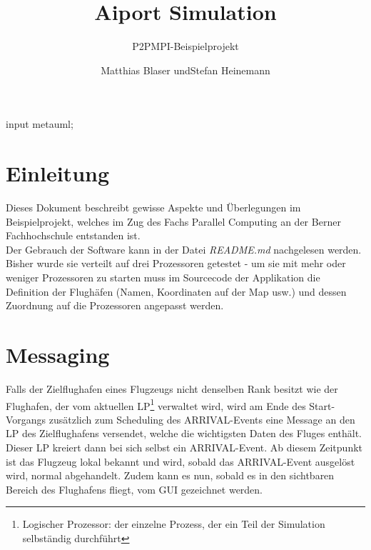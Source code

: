 \documentclass[oneside,DIV12,BCOR0.5cm,bibliography=totoc]{template}
\begin{document}
\begin{empfile}
\begin{empcmds}
input metauml;
\end{empcmds}


\title{Aiport Simulation}
\subtitle{P2PMPI-Beispielprojekt}

\author{Matthias Blaser undStefan Heinemann }

\maketitle


\section{Einleitung}

Dieses Dokument beschreibt gewisse Aspekte und Überlegungen im Beispielprojekt, 
welches im Zug des Fachs Parallel Computing an der Berner Fachhochschule 
entstanden ist.\\

Der Gebrauch der Software kann in der Datei \emph{README.md} nachgelesen
werden. Bisher wurde sie verteilt auf drei Prozessoren getestet - um
sie mit mehr oder weniger Prozessoren zu starten muss im Sourcecode der
Applikation die Definition der Flughäfen (Namen, Koordinaten auf der
Map usw.) und dessen Zuordnung auf die Prozessoren angepasst werden.


\section{Messaging}

Falls der Zielflughafen eines Flugzeugs nicht denselben Rank besitzt
wie der Flughafen, der vom aktuellen LP\footnote{Logischer Prozessor:
der einzelne Prozess, der ein Teil der Simulation selbständig
durchführt} verwaltet wird, wird am Ende des Start-Vorgangs zusätzlich
zum Scheduling des ARRIVAL-Events eine Message an den LP des
Zielflughafens versendet, welche die wichtigsten Daten des Fluges
enthält. Dieser LP kreiert dann bei sich selbst ein ARRIVAL-Event. Ab
diesem Zeitpunkt ist das Flugzeug lokal bekannt und wird,
sobald das ARRIVAL-Event ausgelöst wird, normal abgehandelt. Zudem
kann es nun, sobald es in den sichtbaren Bereich des Flughafens fliegt,
vom GUI gezeichnet werden. \\


\end{empfile}
\end{document}
